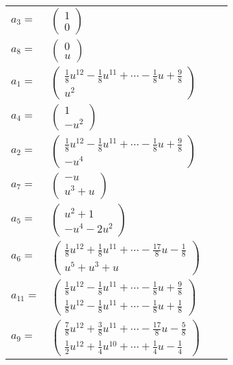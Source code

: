 \documentclass[1p]{elsarticle_modified}
\theoremstyle{definition}
\begin{document}
\begin{tabular}{m{7pt} m{180pt} m{7pt} m{180pt} }
\flushright $a_{3}=$&$\begin{pmatrix}1\\0\end{pmatrix}$ \\
\flushright $a_{8}=$&$\begin{pmatrix}0\\u\end{pmatrix}$ \\
\flushright $a_{1}=$&$\begin{pmatrix}\frac{1}{8} u^{12}-\frac{1}{8} u^{11}+\cdots-\frac{1}{8} u+\frac{9}{8}\\u^2\end{pmatrix}$ \\
\flushright $a_{4}=$&$\begin{pmatrix}1\\- u^2\end{pmatrix}$ \\
\flushright $a_{2}=$&$\begin{pmatrix}\frac{1}{8} u^{12}-\frac{1}{8} u^{11}+\cdots-\frac{1}{8} u+\frac{9}{8}\\- u^4\end{pmatrix}$ \\
\flushright $a_{7}=$&$\begin{pmatrix}- u\\u^3+u\end{pmatrix}$ \\
\flushright $a_{5}=$&$\begin{pmatrix}u^2+1\\- u^4-2 u^2\end{pmatrix}$ \\
\flushright $a_{6}=$&$\begin{pmatrix}\frac{1}{8} u^{12}+\frac{1}{8} u^{11}+\cdots-\frac{17}{8} u-\frac{1}{8}\\u^5+u^3+u\end{pmatrix}$ \\
\flushright $a_{11}=$&$\begin{pmatrix}\frac{1}{8} u^{12}-\frac{1}{8} u^{11}+\cdots-\frac{1}{8} u+\frac{9}{8}\\\frac{1}{8} u^{12}-\frac{1}{8} u^{11}+\cdots-\frac{1}{8} u+\frac{1}{8}\end{pmatrix}$ \\
\flushright $a_{9}=$&$\begin{pmatrix}\frac{7}{8} u^{12}+\frac{3}{8} u^{11}+\cdots-\frac{17}{8} u-\frac{5}{8}\\\frac{1}{2} u^{12}+\frac{1}{4} u^{10}+\cdots+\frac{1}{4} u-\frac{1}{4}\end{pmatrix}$ \\

\end{tabular}
\end{document}
